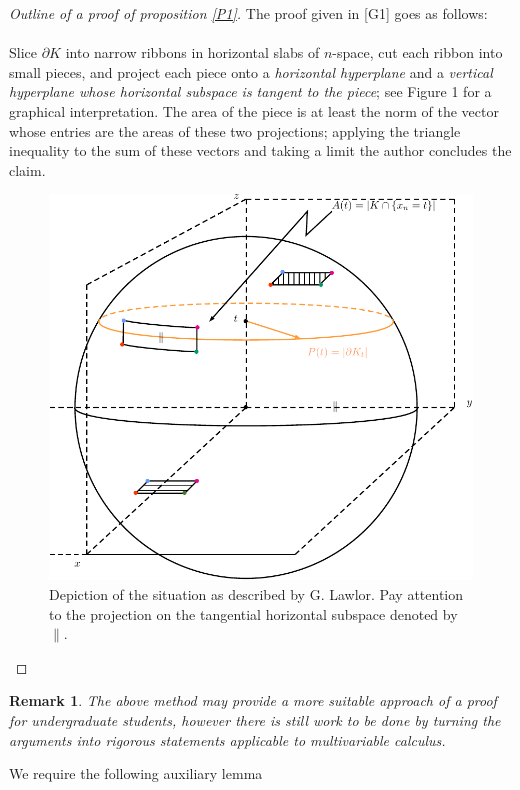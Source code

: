 \documentclass[12pt, a4paper, titlepage]{article}
\newtheorem{remark}{Remark}
\begin{document}
\begin{proof}[Outline of a proof of proposition \ref{P1}] The proof given in [G1] goes as follows: \\
\\Slice $\partial K$ into narrow ribbons in horizontal slabs of $n$-space, cut each ribbon into
small pieces, and project each piece onto a \textit{horizontal hyperplane} and a \textit{vertical hyperplane
whose horizontal subspace is tangent to the piece}; see Figure 1 for a graphical interpretation. The area of the piece is at least the
norm of the vector whose entries are the areas of these two projections; applying the
triangle inequality to the sum of these vectors and taking a limit the author concludes the claim. 
\begin{figure}[hbtp]
\centering
\includegraphics[scale=.9]{images/proof.pdf}
\caption{Depiction of the situation as described by G. Lawlor. Pay attention to the projection on the tangential horizontal subspace denoted by $\|$.}
\end{figure}
\end{proof}
\begin{remark} The above method may provide a more suitable approach of a proof for undergraduate students, however there is still work to be done by turning the arguments into rigorous statements applicable to multivariable calculus. 
\end{remark}
\newpage
We require the following auxiliary lemma
\end{document}

